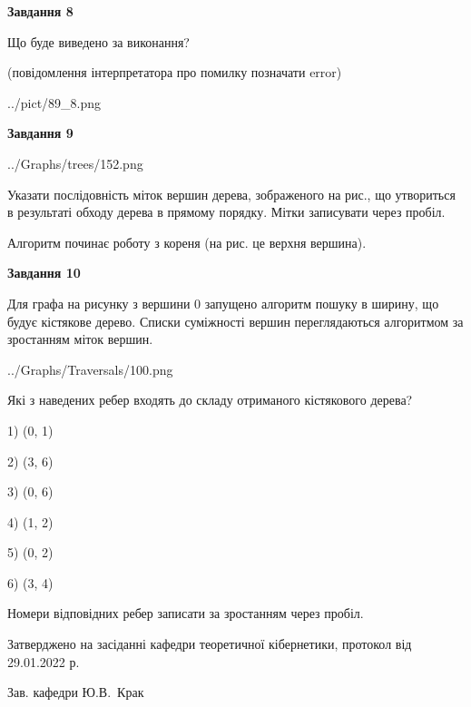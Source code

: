 \documentclass[12pt, ukrainian]{article}
\begin{document}
{\begin {large}
{\begin {center}\textbf{Завдання 8}\end {center}}\par
Що буде виведено за виконання?\par
 (повідомлення інтерпретатора про помилку позначати error)\par
\begin{center}
	{../pict/89_8.png}
\end{center}
\newpage

{\begin {center}\textbf{Завдання 9}\end {center}}\par

\begin{center}
	{../Graphs/trees/152.png}
\end{center}
Указати послідовність міток вершин дерева, зображеного на рис., що утвориться в результаті обходу дерева в прямому порядку. Мітки записувати через пробіл.\par Алгоритм починає роботу з кореня (на рис. це верхня вершина).\par
\newpage

{\begin {center}\textbf{Завдання 10}\end {center}}\par
Для графа на рисунку з вершини 0 запущено алгоритм пошуку в ширину, що будує кістякове дерево. Списки суміжності вершин переглядаються алгоритмом за зростанням міток вершин.\par
\begin{center}
	{../Graphs/Traversals/100.png}
\end{center}
\par Які з наведених ребер входять до складу отриманого кістякового дерева?\par
1) (0, 1)\par
2) (3, 6)\par
3) (0, 6)\par
4) (1, 2)\par
5) (0, 2)\par
6) (3, 4)\par
{\vskip 15pt} Номери відповідних ребер записати за зростанням через пробіл.\par
\newpage


\end {large}
}
{\smallskip \begin {small} Затверджено на засіданні кафедри теоретичної кібернетики, протокол  від   29.01.2022 р.\par\smallskip\smallskip
{\parbox {6.5 cm}{Зав. кафедри \dotfill Ю.В.~Крак}} \end{small}}
\end{document}
